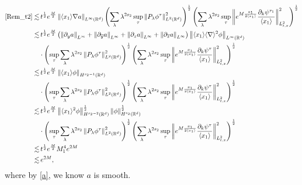 \documentclass[10pt,twoside,a4paper]{article}
\numberwithin{equation}{section}\allowdisplaybreaks
\begin{document}
\begin{align*}
	\eqref{Rem_t2} \lesssim & \,t^{\frac 12} e^{\frac M2} \left\| \langle x_1\rangle\nabla a \right\|_{L^{\infty}(\mathbb{R}^d)} \left(\sum_{\lambda} \lambda^{ 2s_2} \sup_\tau \left\|  P_\lambda \phi^{\tau }\right\|_{L^{2}(\mathbb{R}^d)}^2\right )^{\frac 12} \left(\sum_{\lambda} \lambda^{ 2s_2}\sup_\tau \left\| e^{M \frac{x_1}{2\langle x_1\rangle} } \frac{\partial_k \psi^{\tau_1} }{\langle x_1\rangle }  \right\|_{L^2_{t,x}}^2\right)^{\frac 12}\\
 \lesssim & \,t^{\frac 12} e^{\frac M2} \left(\left\|   \partial_y a \right\|_{L^{\infty}}+\left\|   \partial_{\overline{y}} a \right\|_{L^{\infty} }+\left\|   \partial_z a \right\|_{L^{\infty}}+\left\|   \partial_{\overline{z}} a \right\|_{L^{\infty} }\right) \left\| \langle x_1\rangle \langle\nabla\rangle^2 \phi \right\|_{L^{\infty}(\mathbb{R}^d)}   \\
  &\cdot\left(\sup_\tau \sum_{\lambda} \lambda^{ 2s_2} \left\|  P_\lambda \phi^\tau\right\|_{L^{2}(\mathbb{R}^d)}^2\right)^{\frac 12} \left(\sum_{\lambda} \lambda^{ 2s_2}\sup_\tau \left\| e^{M \frac{x_1}{2\langle x_1\rangle} } \frac{\partial_k \psi^\tau }{\langle x_1\rangle }  \right\|_{L^2_{t,x}}^2\right)^{\frac 12}\\
   \lesssim & \,t^{\frac 12} e^{\frac M2}  \left\| \langle x_1\rangle  \phi \right\|_{H^{s_2-1}(\mathbb{R}^d)}   \\
  &\cdot\left(\sup_\tau \sum_{\lambda} \lambda^{ 2s_2} \left\|  P_\lambda \phi^\tau\right\|_{L^{2}(\mathbb{R}^d)}^2\right)^{\frac 12} \left(\sum_{\lambda} \lambda^{ 2s_2}\sup_\tau \left\| e^{M \frac{x_1}{2\langle x_1\rangle} } \frac{\partial_k \psi^\tau }{\langle x_1\rangle }  \right\|_{L^2_{t,x}}^2\right)^{\frac 12}\\
	\lesssim& \,t^{\frac 12} e^{\frac M2}  \left\| \langle x_1\rangle^2 \phi  \right\|_{H^{s_2 -2}(\mathbb{R}^d)}^{\frac 12} \left\|  \phi \right\|_{H^{s_2  } (\mathbb{R}^d)}^{\frac 12}\\
 &\cdot\left(\sup_\tau \sum_{\lambda} \lambda^{ 2s_2} \left\|  P_\lambda \phi^\tau\right\|_{L^{2}(\mathbb{R}^d)}^2\right)^{\frac 12} \left(\sum_{\lambda} \lambda^{ 2s_2}\sup_\tau \left\| e^{M \frac{x_1}{2\langle x_1\rangle} } \frac{\partial_k \psi^\tau }{\langle x_1\rangle }  \right\|_{L^2_{t,x}}^2\right)^{\frac 12}\\
	\lesssim&\, t^{\frac 12} e^{\frac M2}  M_1^4 e^{2M}\\
	\lesssim&\, e^{2M},
\end{align*}
where by \eqref{a}, we know $a$ is smooth.
\end{document}
